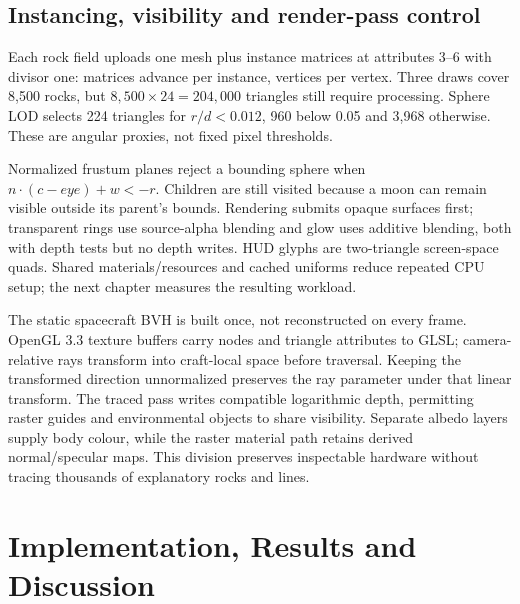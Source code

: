 \documentclass[12pt,a4paper,oneside]{report}
\newcommand{\para}[1]{\par\vspace{12pt}\noindent#1\par}
\begin{document}
\section{Instancing, visibility and render-pass control}\label{sec:efficiency}
\para{Each rock field uploads one mesh plus instance matrices at attributes 3--6 with divisor one: matrices advance per instance, vertices per vertex. Three draws cover 8,500 rocks, but $8,500\times24=204,000$ triangles still require processing. Sphere LOD selects 224 triangles for $r/d<0.012$, 960 below 0.05 and 3,968 otherwise. These are angular proxies, not fixed pixel thresholds.}
\para{Normalized frustum planes reject a bounding sphere when $n\cdot(c-eye)+w<-r$. Children are still visited because a moon can remain visible outside its parent's bounds. Rendering submits opaque surfaces first; transparent rings use source-alpha blending and glow uses additive blending, both with depth tests but no depth writes. HUD glyphs are two-triangle screen-space quads. Shared materials/resources and cached uniforms reduce repeated CPU setup; the next chapter measures the resulting workload.}
\para{The static spacecraft BVH is built once, not reconstructed on every frame. OpenGL 3.3 texture buffers carry nodes and triangle attributes to GLSL; camera-relative rays transform into craft-local space before traversal. Keeping the transformed direction unnormalized preserves the ray parameter under that linear transform. The traced pass writes compatible logarithmic depth, permitting raster guides and environmental objects to share visibility. Separate albedo layers supply body colour, while the raster material path retains derived normal/specular maps. This division preserves inspectable hardware without tracing thousands of explanatory rocks and lines.}

\chapter{Implementation, Results and Discussion}\label{ch:results}
\end{document}
